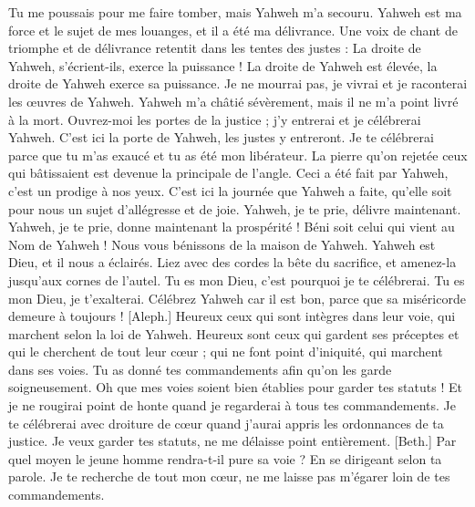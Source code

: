 \begin{multicols}{2}
Tu me poussais pour me faire tomber, mais Yahweh m'a secouru.
Yahweh est ma force et le sujet de mes louanges, et il a été ma délivrance.
Une voix de chant de triomphe et de délivrance retentit dans les tentes des justes : La droite de Yahweh, s'écrient-ils, exerce la puissance !
La droite de Yahweh est élevée, la droite de Yahweh exerce sa puissance.
Je ne mourrai pas, je vivrai et je raconterai les œuvres de Yahweh.
Yahweh m'a châtié sévèrement, mais il ne m'a point livré à la mort.
Ouvrez-moi les portes de la justice ; j'y entrerai et je célébrerai Yahweh.
C'est ici la porte de Yahweh, les justes y entreront.
Je te célébrerai parce que tu m'as exaucé et tu as été mon libérateur.
La pierre qu’on rejetée ceux qui bâtissaient est devenue la principale de l’angle.
Ceci a été fait par Yahweh, c’est un prodige à nos yeux.
C'est ici la journée que Yahweh a faite, qu’elle soit pour nous un sujet d’allégresse et de joie.
Yahweh, je te prie, délivre maintenant. Yahweh, je te prie, donne maintenant la prospérité !
Béni soit celui qui vient au Nom de Yahweh ! Nous vous bénissons de la maison de Yahweh.
Yahweh est Dieu, et il nous a éclairés. Liez avec des cordes la bête du sacrifice, et amenez-la jusqu’aux cornes de l'autel.
Tu es mon Dieu, c'est pourquoi je te célébrerai. Tu es mon Dieu, je t'exalterai.
Célébrez Yahweh car il est bon, parce que sa miséricorde demeure à toujours !
\VerseOne{}[Aleph.] Heureux ceux qui sont intègres dans leur voie, qui marchent selon la loi de Yahweh.
Heureux sont ceux qui gardent ses préceptes et qui le cherchent de tout leur cœur ;
qui ne font point d'iniquité, qui marchent dans ses voies.
Tu as donné tes commandements afin qu'on les garde soigneusement.
Oh que mes voies soient bien établies pour garder tes statuts !
Et je ne rougirai point de honte quand je regarderai à tous tes commandements.
Je te célébrerai avec droiture de cœur quand j'aurai appris les ordonnances de ta justice.
Je veux garder tes statuts, ne me délaisse point entièrement.
[Beth.] Par quel moyen le jeune homme rendra-t-il pure sa voie ? En se dirigeant selon ta parole.
Je te recherche de tout mon cœur, ne me laisse pas m’égarer loin de tes commandements.

\end{multicols}
